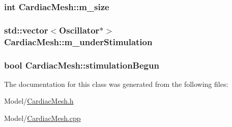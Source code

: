 \hypertarget{class_cardiac_mesh_aea33a4be0162859a292958757ac934fc}{
\subsubsection[{m\+\_\+size}]{\setlength{\rightskip}{0pt plus 5cm}int Cardiac\+Mesh\+::m\+\_\+size}}\label{class_cardiac_mesh_aea33a4be0162859a292958757ac934fc}
\hypertarget{class_cardiac_mesh_a21749f0b4af8fe59552f97058982f695}{
\subsubsection[{m\+\_\+under\+Stimulation}]{\setlength{\rightskip}{0pt plus 5cm}std\+::vector$<${\bf Oscillator}$\ast$$>$ Cardiac\+Mesh\+::m\+\_\+under\+Stimulation}}\label{class_cardiac_mesh_a21749f0b4af8fe59552f97058982f695}
\hypertarget{class_cardiac_mesh_ac14b1f228c8426e067df4a925824348e}{
\subsubsection[{stimulation\+Begun}]{\setlength{\rightskip}{0pt plus 5cm}bool Cardiac\+Mesh\+::stimulation\+Begun}}\label{class_cardiac_mesh_ac14b1f228c8426e067df4a925824348e}


The documentation for this class was generated from the following files\+:\begin{DoxyCompactItemize}
\item 
Model/\hyperlink{_cardiac_mesh_8h}{Cardiac\+Mesh.\+h}\item 
Model/\hyperlink{_cardiac_mesh_8cpp}{Cardiac\+Mesh.\+cpp}\end{DoxyCompactItemize}
